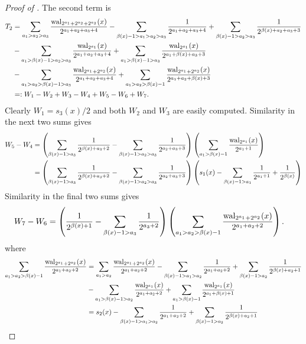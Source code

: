 \documentclass[acmsmall]{acmart}
\begin{document}
\begin{proof}[Proof of ]
    The second term is 
    \begin{align*}
        T_2 &= \sum_{a_1>a_2>a_3} \frac{\mathrm{wal}_{2^{a_1}+2^{a_2}+2^{a_3}}(x)}{2^{a_1+a_2+a_3+4}} - \sum_{\beta(x)-1 > a_1 > a_2 > a_3} \frac{1}{2^{a_1+a_2+a_3+4}} + \sum_{\beta(x)-1 > a_2 > a_3} \frac{1}{2^{\beta(x)+a_2+a_3+3}} \\ & - \sum_{a_1 > \beta(x)-1 > a_2 > a_3} \frac{\mathrm{wal}_{2^{a_1}}(x)}{2^{a_1+a_2+a_3+4}} + \sum_{a_1 > \beta(x)-1 > a_3}  \frac{\mathrm{wal}_{2^{a_1}}(x)}{2^{a_1+\beta(x)+a_3+3}} \\ &- \sum_{a_1 > a_2 > \beta(x)-1 > a_3}\frac{\mathrm{wal}_{2^{a_1}+2^{a_2}}(x)}{2^{a_1+a_2+a_3+4}} + \sum_{a_1 > a_2 > \beta(x)-1} \frac{\mathrm{wal}_{2^{a_1}+2^{a_2}}(x)}{2^{a_1+a_2+\beta(x)+3}} \\
        &=: W_1-W_2+W_3-W_4+W_5-W_6+W_7.
    \end{align*}
    Clearly $W_1 = s_3(x)/2$ and both $W_2$ and $W_3$ are easily computed. Similarity in the next two sums gives
    \begin{align*}
        W_5 - W_4 &= \left(\sum_{\beta(x)-1 > a_3}\frac{1}{2^{\beta(x)+a_3+2}}-\sum_{\beta(x)-1>a_2>a_3} \frac{1}{2^{a_2+a_3+3}}\right) \left(\sum_{a_1 > \beta(x)-1} \frac{\mathrm{wal}_{2^{a_1}}(x)}{2^{a_1+1}} \right) \\
        &= \left(\sum_{\beta(x)-1 > a_3}\frac{1}{2^{\beta(x)+a_3+2}}-\sum_{\beta(x)-1>a_2>a_3} \frac{1}{2^{a_2+a_3+3}}\right)\left(s_1(x) - \sum_{\beta(x)-1 > a_1} \frac{1}{2^{a_1+1}} + \frac{1}{2^{\beta(x)}}\right)
    \end{align*}
    Similarity in the final two sums gives  
    \begin{align*}
        W_7 - W_6 &= \left(\frac{1}{2^{\beta(x)+1}}-\sum_{\beta(x)-1 > a_3} \frac{1}{2^{a_3+2}}\right) \left(\sum_{a_1>a_2 > \beta(x)-1} \frac{\mathrm{wal}_{2^{a_1}+2^{a_2}}(x)}{2^{a_1+a_2+2}}\right).
    \end{align*}
    where 
    \begin{align*}
        \sum_{a_1>a_2 > \beta(x)-1} \frac{\wal_{2^{a_1}+2^{a_2}}(x)}{2^{a_1+a_2+2}} &= \sum_{a_1>a_2} \frac{\wal_{2^{a_1}+2^{a_2}}(x)}{2^{a_1+a_2+2}} - \sum_{\beta(x)-1 > a_1 > a_2} \frac{1}{2^{a_1+a_2+2}} + \sum_{\beta(x)-1 > a_2} \frac{1}{2^{\beta(x)+a_2+1}} \\ &- \sum_{a_1 > \beta(x)-1 > a_2} \frac{\wal_{2^{a_1}}(x)}{2^{a_1+a_2+2}} + \sum_{a_1 > \beta(x)-1} \frac{\wal_{2^{a_1}}(x)}{2^{a_1+\beta(x)+1}} \\
        &= s_2(x) - \sum_{\beta(x)-1 > a_1 > a_2} \frac{1}{2^{a_1+a_2+2}} + \sum_{\beta(x)-1 > a_2} \frac{1}{2^{\beta(x)+a_2+1}}\\

\end{align*}
\end{proof}
\end{document}
